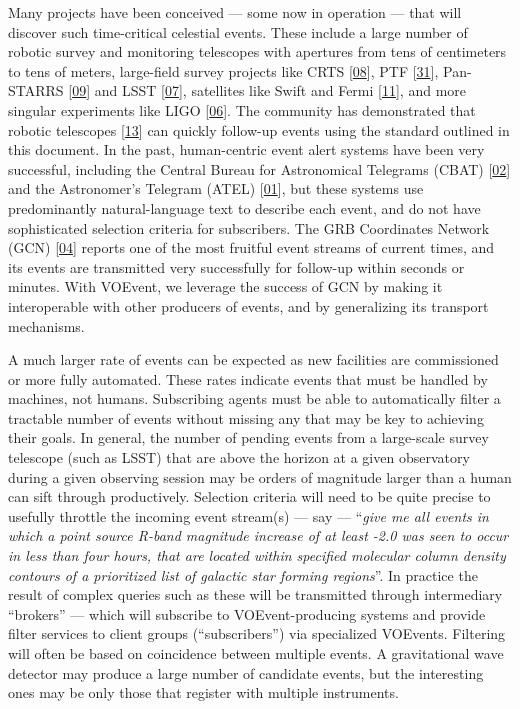 \documentclass[11pt,a4paper]{ivoa}
\begin{document}
Many projects have been conceived --- some now in operation --- that will discover such time-critical celestial events. These include a large number of robotic survey and monitoring telescopes with apertures from tens of centimeters to tens of meters, large-field survey projects like CRTS [\hyperref[bib08]{08}], PTF [\hyperref[bib31]{31}], Pan-STARRS [\hyperref[bib09]{09}] and LSST [\hyperref[bib07]{07}], satellites like Swift and Fermi [\hyperref[bib11]{11}], and more singular experiments like LIGO [\hyperref[bib06]{06}]. The community has demonstrated that robotic telescopes [\hyperref[bib13]{13}] can quickly follow-up events using the standard outlined in this document. In the past, human-centric event alert systems have been very successful, including the Central Bureau for Astronomical Telegrams (CBAT) [\hyperref[bib02]{02}] and the Astronomer's Telegram (ATEL) [\hyperref[bib01]{01}], but these systems use predominantly natural-language text to describe each event, and do not have sophisticated selection criteria for subscribers. The GRB Coordinates Network (GCN) [\hyperref[bib04]{04}] reports one of the most fruitful event streams of current times, and its events are transmitted very successfully for follow-up within seconds or minutes. With VOEvent, we leverage the success of GCN by making it interoperable with other producers of events, and by generalizing its transport mechanisms. 

A much larger rate of events can be expected as new facilities are commissioned or more fully automated. These rates indicate events that must be handled by machines, not humans. Subscribing agents must be able to automatically filter a tractable number of events without missing any that may be key to achieving their goals. In general, the number of pending events from a large-scale survey telescope (such as LSST) that are above the horizon at a given observatory during a given observing session may be orders of magnitude larger than a human can sift through productively. Selection criteria will need to be quite precise to usefully throttle the incoming event stream(s) --- say --- ``\emph{give me all events in which a point source R-band magnitude increase of at least -2.0 was seen to occur in less than four hours, that are located within specified molecular column density contours of a prioritized list of galactic star forming regions}''. In practice the result of complex queries such as these will be transmitted through intermediary ``brokers'' --- which will subscribe to VOEvent-producing systems and provide filter services to client groups (``subscribers'') via specialized VOEvents. Filtering will often be based on coincidence between multiple events. A gravitational wave detector may produce a large number of candidate events, but the interesting ones may be only those that register with multiple instruments.
\end{document}
